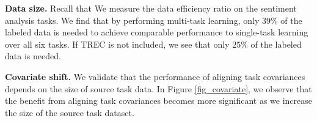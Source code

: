 
\textbf{Data size.}
Recall that 
We measure the data efficiency ratio on the sentiment analysis tasks.
We find that by performing multi-task learning, only $39\%$ of the labeled data is needed to achieve comparable performance to single-task learning over all six tasks.
If TREC is not included, we see that only $25\%$ of the labeled data is needed.


\textbf{Covariate shift.}
We validate that the performance of aligning task covariances depends on the size of source task data.
In Figure \ref{fig_covariate}, we observe that the benefit from aligning task covariances becomes more significant as we increase the size of the source task dataset.

